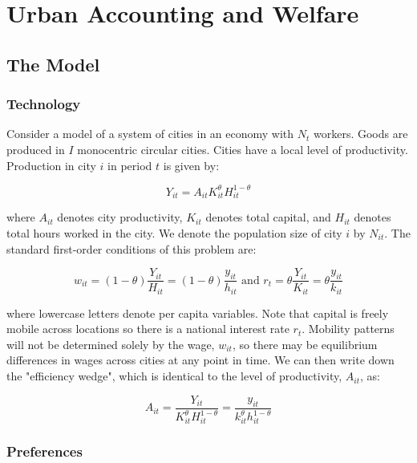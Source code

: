 \chapter{Urban Accounting and Welfare}

\section{The Model}

\subsection{Technology}

Consider a model of a system of cities in an economy with $N_t$ workers. Goods are produced in $I$ monocentric circular cities. Cities have a local level of productivity. Production in city $i$ in period $t$ is given by:

\begin{equation*}
    Y_{it} = A_{it}K_{it}^{\theta}H_{it}^{1 - \theta}
\end{equation*}

where $A_{it}$ denotes city productivity, $K_{it}$ denotes total capital, and $H_{it}$ denotes total hours worked in the city. We denote the population size of city $i$ by $N_{it}$. The standard first-order conditions of this problem are:

\begin{equation}
    w_{it} = (1 - \theta)\frac{Y_{it}}{H_{it}} = (1 - \theta) \frac{y_{it}}{h_{it}} \text{ and } r_t = \theta \frac{Y_{it}}{K_{it}} = \theta \frac{y_{it}}{k_{it}}
\end{equation}

where lowercase letters denote per capita variables. Note that capital is freely mobile across locations so there is a national interest rate $r_t$. Mobility patterns will not be determined solely by the wage, $w_{it}$, so there may be equilibrium differences in wages across cities at any point in time. We can then write down the "efficiency wedge", which is identical to the level of productivity, $A_{it}$, as:

\begin{equation}
    A_{it} = \frac{Y_{it}}{K_{it}^{\theta}H_{it}^{1 - \theta}} = \frac{y_{it}}{k_{it}^{\theta} h_{it}^{1 - \theta}}
\end{equation}

\subsection{Preferences}

